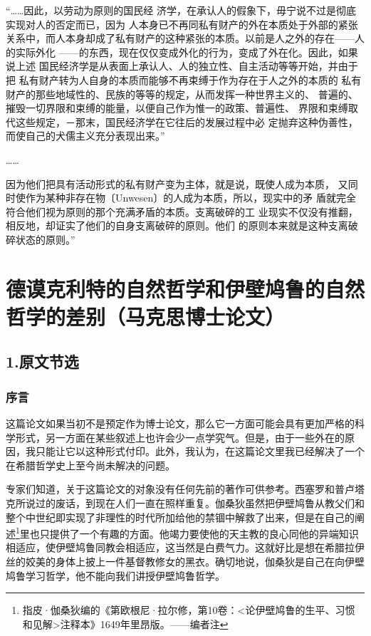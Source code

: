 \documentclass[a4paper,twoside,12pt]{ctexart}
\begin{document}
\begin{fangsong}
“……因此，以劳动为原则的国民经
济学，在承认人的假象下，毋宁说不过是彻底实现对人的否定而已，因为
人本身已不再同私有财产的外在本质处于外部的紧张关系中，而人本身却成了私有财产的这种紧张的本质。以前是人之外的存在——人的实际外化
——的东西，现在仅仅变成外化的行为，变成了外在化。因此，如果说上述
国民经济学是从表面上承认人、人的独立性、自主活动等等开始，并由于把
私有财产转为人自身的本质而能够不再束缚于作为存在于人之外的本质的
私有财产的那些地域性的、民族的等等的规定，从而发挥一种世界主义的、
普遍的、摧毁一切界限和束缚的能量，以便自己作为惟一的政策、普遍性、
界限和束缚取代这些规定，－那末，国民经济学在它往后的发展过程中必
定抛弃这种伪善性，而使自己的犬儒主义充分表现出来。”

……

因为他们把具有活动形式的私有财产变为主体，就是说，既使人成为本质，
又同时使作为某种非存在物〔Unwesen〕的人成为本质，所以，现实中的矛
盾就完全符合他们视为原则的那个充满矛盾的本质。支离破碎的工
业现实不仅没有推翻，相反地，却证实了他们的自身支离破碎的原则。他们
的原则本来就是这种支离破碎状态的原则。”
\end{fangsong}



\section{德谟克利特的自然哲学和伊壁鸠鲁的自然哲学的差别（马克思博士论文）}

\subsection{1.原文节选}
\subsubsection{序言}
这篇论文如果当初不是预定作为博士论文，那么它一方面可能会具有更加严格的科学形式，另一方面在某些叙述上也许会少一点学究气。但是，由于一些外在的原因，我只能让它以这种形式付印。此外，我认为，在这篇论文里我已经解决了一个在希腊哲学史上至今尚未解决的问题。

专家们知道，关于这篇论文的对象没有任何先前的著作可供参考。西塞罗和普卢塔克所说过的废话，到现在人们一直在照样重复。伽桑狄虽然把伊壁鸠鲁从教父们和整个中世纪即实现了非理性的时代所加给他的禁锢中解救了出来，但是在自己的阐述\footnote{指皮·伽桑狄编的《第欧根尼·拉尔修，第10卷：<论伊壁鸠鲁的生平、习惯和见解>注释本》1649年里昂版。——编者注}里也只提供了一个有趣的方面。他竭力要使他的天主教的良心同他的异端知识相适应，使伊壁鸠鲁同教会相适应，这当然是白费气力。这就好比是想在希腊拉伊丝的姣美的身体上披上一件基督教修女的黑衣。确切地说，伽桑狄是自己在向伊壁鸠鲁学习哲学，他不能向我们讲授伊壁鸠鲁哲学。
\end{document}
